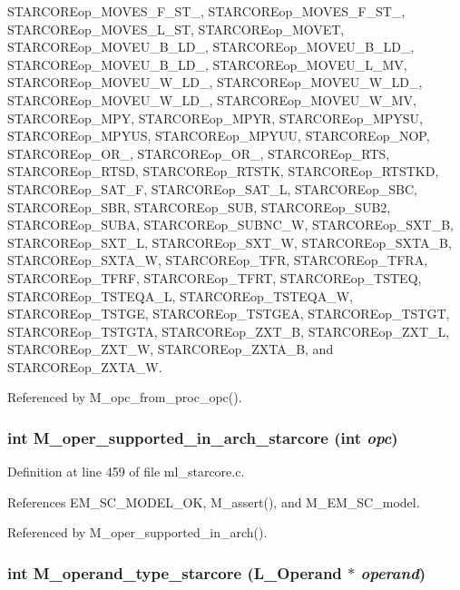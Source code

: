 STARCOREop\_\-MOVES\_\-F\_\-ST\_, STARCOREop\_\-MOVES\_\-F\_\-ST\_, STARCOREop\_\-MOVES\_\-L\_\-ST, STARCOREop\_\-MOVET, STARCOREop\_\-MOVEU\_\-B\_\-LD\_, STARCOREop\_\-MOVEU\_\-B\_\-LD\_, STARCOREop\_\-MOVEU\_\-B\_\-LD\_, STARCOREop\_\-MOVEU\_\-L\_\-MV, STARCOREop\_\-MOVEU\_\-W\_\-LD\_, STARCOREop\_\-MOVEU\_\-W\_\-LD\_, STARCOREop\_\-MOVEU\_\-W\_\-LD\_, STARCOREop\_\-MOVEU\_\-W\_\-MV, STARCOREop\_\-MPY, STARCOREop\_\-MPYR, STARCOREop\_\-MPYSU, STARCOREop\_\-MPYUS, STARCOREop\_\-MPYUU, STARCOREop\_\-NOP, STARCOREop\_\-OR\_, STARCOREop\_\-OR\_, STARCOREop\_\-RTS, STARCOREop\_\-RTSD, STARCOREop\_\-RTSTK, STARCOREop\_\-RTSTKD, STARCOREop\_\-SAT\_\-F, STARCOREop\_\-SAT\_\-L, STARCOREop\_\-SBC, STARCOREop\_\-SBR, STARCOREop\_\-SUB, STARCOREop\_\-SUB2, STARCOREop\_\-SUBA, STARCOREop\_\-SUBNC\_\-W, STARCOREop\_\-SXT\_\-B, STARCOREop\_\-SXT\_\-L, STARCOREop\_\-SXT\_\-W, STARCOREop\_\-SXTA\_\-B, STARCOREop\_\-SXTA\_\-W, STARCOREop\_\-TFR, STARCOREop\_\-TFRA, STARCOREop\_\-TFRF, STARCOREop\_\-TFRT, STARCOREop\_\-TSTEQ, STARCOREop\_\-TSTEQA\_\-L, STARCOREop\_\-TSTEQA\_\-W, STARCOREop\_\-TSTGE, STARCOREop\_\-TSTGEA, STARCOREop\_\-TSTGT, STARCOREop\_\-TSTGTA, STARCOREop\_\-ZXT\_\-B, STARCOREop\_\-ZXT\_\-L, STARCOREop\_\-ZXT\_\-W, STARCOREop\_\-ZXTA\_\-B, and STARCOREop\_\-ZXTA\_\-W.

Referenced by M\_\-opc\_\-from\_\-proc\_\-opc().
\subsubsection{\setlength{\rightskip}{0pt plus 5cm}int M\_\-oper\_\-supported\_\-in\_\-arch\_\-starcore (int {\em opc})}\label{ml__starcore_8c_1b9acf0e6a3c40984d67c2970758fec9}




Definition at line 459 of file ml\_\-starcore.c.

References EM\_\-SC\_\-MODEL\_\-OK, M\_\-assert(), and M\_\-EM\_\-SC\_\-model.

Referenced by M\_\-oper\_\-supported\_\-in\_\-arch().
\subsubsection{\setlength{\rightskip}{0pt plus 5cm}int M\_\-operand\_\-type\_\-starcore (L\_\-Operand $\ast$ {\em operand})}\label{ml__starcore_8c_b442f0a0fc34c932c1f5ec8dd7cea303}




